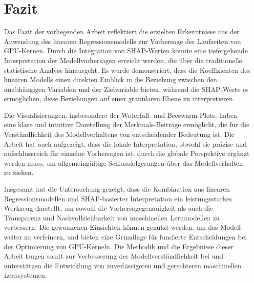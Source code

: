 \chapter{Fazit}

Das Fazit der vorliegenden Arbeit reflektiert die erzielten Erkenntnisse 
aus der Anwendung des linearen Regressionsmodells zur Vorhersage der Laufzeiten von GPU-Kernen. 
Durch die Integration von SHAP-Werten konnte eine tiefergehende Interpretation der Modellvorhersagen 
erreicht werden, die über die traditionelle statistische Analyse hinausgeht. Es wurde demonstriert,
dass die Koeffizienten des linearen Modells einen direkten Einblick in die Beziehung zwischen den 
unabhängigen Variablen und der Zielvariable bieten, während die SHAP-Werte es ermöglichen, 
diese Beziehungen auf einer granularen Ebene zu interpretieren.

Die Visualisierungen, insbesondere der Waterfall- und Beeswarm-Plots,
haben eine klare und intuitive Darstellung der Merkmals-Beiträge ermöglicht, die für die 
Verständlichkeit des Modellverhaltens von entscheidender Bedeutung ist. Die Arbeit hat auch aufgezeigt, 
dass die lokale Interpretation, obwohl sie präzise und aufschlussreich für einzelne Vorhersagen ist, 
durch die globale Perspektive ergänzt werden muss, um allgemeingültige Schlussfolgerungen über das Modellverhalten zu ziehen.

Insgesamt hat die Untersuchung gezeigt, dass die Kombination aus linearen Regressionsmodellen und SHAP-basierter 
Interpretation ein leistungsstarkes Werkzeug darstellt, um sowohl die Vorhersagegenauigkeit als auch die Transparenz 
und Nachvollziehbarkeit von maschinellen Lernmodellen zu verbessern. Die gewonnenen Einsichten können genutzt werden, 
um das Modell weiter zu verfeinern, und bieten eine Grundlage für fundierte Entscheidungen bei der Optimierung von GPU-Kerneln. 
Die Methodik und die Ergebnisse dieser Arbeit tragen somit zur Verbesserung der Modellverständlichkeit bei und unterstützen 
die Entwicklung von zuverlässigeren und gerechteren maschinellen Lernsystemen.